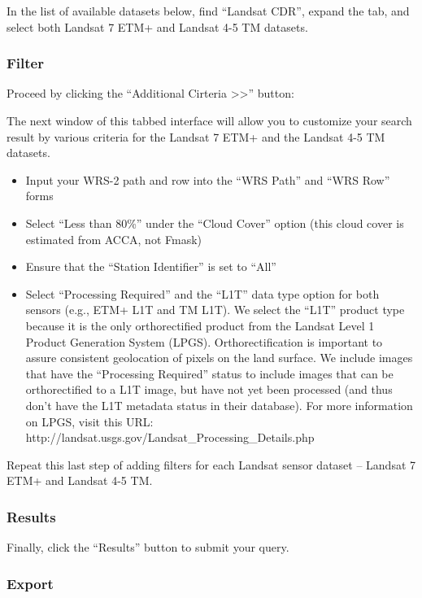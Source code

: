 \documentclass{article}
\begin{document}
In the list of available datasets below, find ``Landsat CDR'', expand
the tab, and select both Landsat 7 ETM+ and Landsat 4-5 TM datasets.

\subsubsection{Filter}\label{filter}

Proceed by clicking the ``Additional Cirteria
\textgreater{}\textgreater{}'' button:

The next window of this tabbed interface will allow you to customize
your search result by various criteria for the Landsat 7 ETM+ and the
Landsat 4-5 TM datasets.

\begin{itemize}
\itemsep1pt\parskip0pt
\item
  Input your WRS-2 path and row into the ``WRS Path'' and ``WRS Row''
  forms
\item
  Select ``Less than 80\%'' under the ``Cloud Cover'' option (this cloud
  cover is estimated from ACCA, not Fmask)
\item
  Ensure that the ``Station Identifier'' is set to ``All''
\item
  Select ``Processing Required'' and the ``L1T'' data type option for
  both sensors (e.g., ETM+ L1T and TM L1T). We select the ``L1T''
  product type because it is the only orthorectified product from the
  Landsat Level 1 Product Generation System (LPGS). Orthorectification
  is important to assure consistent geolocation of pixels on the land
  surface. We include images that have the ``Processing Required''
  status to include images that can be orthorectified to a L1T image,
  but have not yet been processed (and thus don't have the L1T metadata
  status in their database). For more information on LPGS, visit this
  URL: http://landsat.usgs.gov/Landsat\_Processing\_Details.php
\end{itemize}

Repeat this last step of adding filters for each Landsat sensor dataset
-- Landsat 7 ETM+ and Landsat 4-5 TM.

\subsubsection{Results}\label{results}

Finally, click the ``Results'' button to submit your query.

\subsubsection{Export}\label{export}
\end{document}
